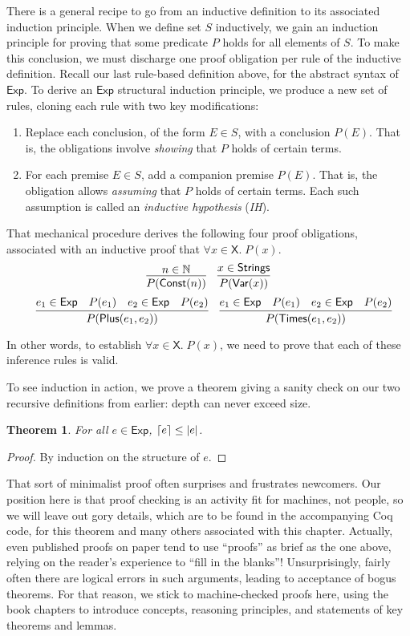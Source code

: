 \documentclass{amsbook}
\newtheorem{theorem}{Theorem}[chapter]
\theoremstyle{definition}
\theoremstyle{remark}
\numberwithin{section}{chapter}
\numberwithin{equation}{chapter}
\begin{document}
There is a general recipe to go from an inductive definition to its associated induction principle.
When we define set $S$ inductively, we gain an induction principle for proving that some predicate $P$ holds for all elements of $S$.
To make this conclusion, we must discharge one proof obligation per rule of the inductive definition.
Recall our last rule-based definition above, for the abstract syntax of $\mathsf{Exp}$.
To derive an $\mathsf{Exp}$ structural induction principle, we produce a new set of rules, cloning each rule with two key modifications:
\begin{enumerate}
  \item Replace each conclusion, of the form $E \in S$, with a conclusion $P(E)$.  That is, the obligations involve \emph{showing} that $P$ holds of certain terms.
  \item For each premise $E \in S$, add a companion premise $P(E)$.  That is, the obligation allows \emph{assuming} that $P$ holds of certain terms.  Each such assumption is called an \emph{inductive hypothesis} (\emph{IH}).
\end{enumerate}

That mechanical procedure derives the following four proof obligations, associated with an inductive proof that $\forall x \in \mathsf{X}. \; P(x)$.
$$\infer{P(\mathsf{Const}(n))}{
  n \in \mathbb N
}
\quad \infer{P(\mathsf{Var}(x))}{
  x \in \mathsf{Strings}
}$$
$$\quad \infer{P(\mathsf{Plus}(e_1, e_2))}{
  e_1 \in \mathsf{Exp}
  & P(e_1)
  & e_2 \in \mathsf{Exp}
  & P(e_2)
}
\quad \infer{P(\mathsf{Times}(e_1, e_2))}{
  e_1 \in \mathsf{Exp}
  & P(e_1)
  & e_2 \in \mathsf{Exp}
  & P(e_2)
}$$

In other words, to establish $\forall x \in \mathsf{X}. \; P(x)$, we need to prove that each of these inference rules is valid.

To see induction in action, we prove a theorem giving a sanity check on our two recursive definitions from earlier: depth can never exceed size.
\begin{theorem}
  For all $e \in \mathsf{Exp}$, ${\left \lceil e \right \rceil} \leq {\left \lvert e \right \rvert}$.
\end{theorem}
\begin{proof}
  By induction on the structure of $e$.
\end{proof}

That sort of minimalist proof often surprises and frustrates newcomers.
Our position here is that proof checking is an activity fit for machines, not people, so we will leave out gory details, which are to be found in the accompanying Coq code, for this theorem and many others associated with this chapter.
Actually, even published proofs on paper tend to use ``proofs'' as brief as the one above, relying on the reader's experience to ``fill in the blanks''!
Unsurprisingly, fairly often there are logical errors in such arguments, leading to acceptance of bogus theorems.
For that reason, we stick to machine-checked proofs here, using the book chapters to introduce concepts, reasoning principles, and statements of key theorems and lemmas.
\end{document}
